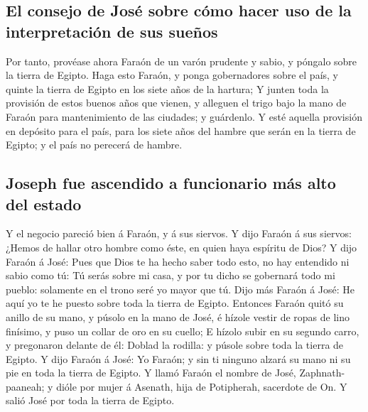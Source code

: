 \hypertarget{el-consejo-de-josuxe9-sobre-cuxf3mo-hacer-uso-de-la-interpretaciuxf3n-de-sus-sueuxf1os}{%
\subsection{El consejo de José sobre cómo hacer uso de la interpretación
de sus
sueños}\label{el-consejo-de-josuxe9-sobre-cuxf3mo-hacer-uso-de-la-interpretaciuxf3n-de-sus-sueuxf1os}}

 Por tanto, provéase ahora Faraón de un varón prudente y
sabio, y póngalo sobre la tierra de Egipto.  Haga esto
Faraón, y ponga gobernadores sobre el país, y quinte la tierra de Egipto
en los siete años de la hartura;  Y junten toda la
provisión de estos buenos años que vienen, y alleguen el trigo bajo la
mano de Faraón para mantenimiento de las ciudades; y guárdenlo.
 Y esté aquella provisión en depósito para el país, para
los siete años del hambre que serán en la tierra de Egipto; y el país no
perecerá de hambre.

\hypertarget{joseph-fue-ascendido-a-funcionario-muxe1s-alto-del-estado}{%
\subsection{Joseph fue ascendido a funcionario más alto del
estado}\label{joseph-fue-ascendido-a-funcionario-muxe1s-alto-del-estado}}

 Y el negocio pareció bien á Faraón, y á sus siervos.
 Y dijo Faraón á sus siervos: ¿Hemos de hallar otro hombre
como éste, en quien haya espíritu de Dios?  Y dijo Faraón á
José: Pues que Dios te ha hecho saber todo esto, no hay entendido ni
sabio como tú:  Tú serás sobre mi casa, y por tu dicho se
gobernará todo mi pueblo: solamente en el trono seré yo mayor que tú.
 Dijo más Faraón á José: He aquí yo te he puesto sobre toda
la tierra de Egipto.  Entonces Faraón quitó su anillo de su
mano, y púsolo en la mano de José, é hízole vestir de ropas de lino
finísimo, y puso un collar de oro en su cuello;  E hízolo
subir en su segundo carro, y pregonaron delante de él: Doblad la
rodilla: y púsole sobre toda la tierra de Egipto.  Y dijo
Faraón á José: Yo Faraón; y sin ti ninguno alzará su mano ni su pie en
toda la tierra de Egipto.  Y llamó Faraón el nombre de
José, Zaphnath-paaneah; y dióle por mujer á Asenath, hija de Potipherah,
sacerdote de On. Y salió José por toda la tierra de Egipto.

